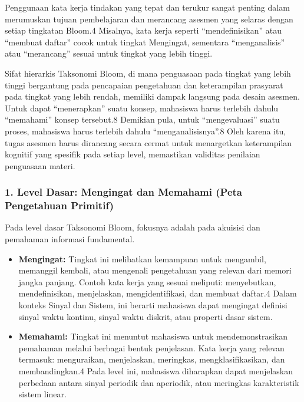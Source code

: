 \documentclass[
  letterpaper,
  DIV=11,
  numbers=noendperiod]{scrreprt}
\begin{document}
Penggunaan kata kerja tindakan yang tepat dan terukur sangat penting
dalam merumuskan tujuan pembelajaran dan merancang asesmen yang selaras
dengan setiap tingkatan Bloom.4 Misalnya, kata kerja seperti
``mendefinisikan'' atau ``membuat daftar'' cocok untuk tingkat
Mengingat, sementara ``menganalisis'' atau ``merancang'' sesuai untuk
tingkat yang lebih tinggi.

Sifat hierarkis Taksonomi Bloom, di mana penguasaan pada tingkat yang
lebih tinggi bergantung pada pencapaian pengetahuan dan keterampilan
prasyarat pada tingkat yang lebih rendah, memiliki dampak langsung pada
desain asesmen. Untuk dapat ``menerapkan'' suatu konsep, mahasiswa harus
terlebih dahulu ``memahami'' konsep tersebut.8 Demikian pula, untuk
``mengevaluasi'' suatu proses, mahasiswa harus terlebih dahulu
``menganalisisnya''.8 Oleh karena itu, tugas asesmen harus dirancang
secara cermat untuk menargetkan keterampilan kognitif yang spesifik pada
setiap level, memastikan validitas penilaian penguasaan materi.

\subsubsection{1. Level Dasar: Mengingat dan Memahami (Peta Pengetahuan
Primitif)}\label{level-dasar-mengingat-dan-memahami-peta-pengetahuan-primitif}

Pada level dasar Taksonomi Bloom, fokusnya adalah pada akuisisi dan
pemahaman informasi fundamental.

\begin{itemize}
\item
  \textbf{Mengingat:} Tingkat ini melibatkan kemampuan untuk mengambil,
  memanggil kembali, atau mengenali pengetahuan yang relevan dari memori
  jangka panjang. Contoh kata kerja yang sesuai meliputi: menyebutkan,
  mendefinisikan, menjelaskan, mengidentifikasi, dan membuat daftar.4
  Dalam konteks Sinyal dan Sistem, ini berarti mahasiswa dapat mengingat
  definisi sinyal waktu kontinu, sinyal waktu diskrit, atau properti
  dasar sistem.
\item
  \textbf{Memahami:} Tingkat ini menuntut mahasiswa untuk
  mendemonstrasikan pemahaman melalui berbagai bentuk penjelasan. Kata
  kerja yang relevan termasuk: menguraikan, menjelaskan, meringkas,
  mengklasifikasikan, dan membandingkan.4 Pada level ini, mahasiswa
  diharapkan dapat menjelaskan perbedaan antara sinyal periodik dan
  aperiodik, atau meringkas karakteristik sistem linear.
\end{itemize}
\end{document}

